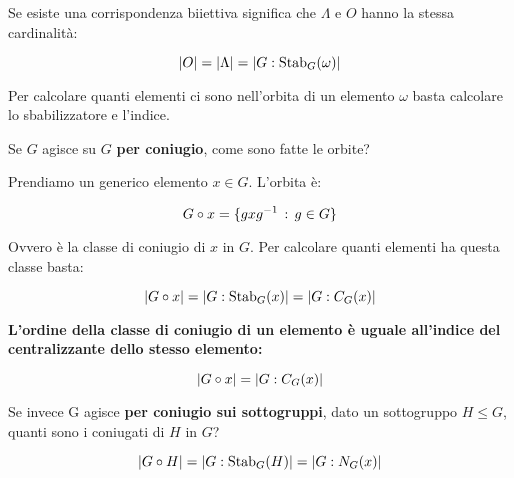 Se esiste una corrispondenza biiettiva significa che $\Lambda$ e $O$ hanno la stessa cardinalità:

\begin{equation}
	\label{eq:ordine_orbita} \lvert O \rvert = \lvert \Lambda \rvert = \lvert G:\operatorname{Stab}_G(\omega) \rvert
\end{equation}

Per calcolare quanti elementi ci sono nell'orbita di un elemento $\omega$ basta calcolare lo sbabilizzatore e l'indice.

Se $G$ agisce su $G$ \textbf{per coniugio}, come sono fatte le orbite?

Prendiamo un generico elemento $x \in G$. L'orbita è:

\begin{equation}
	G \circ x = \{gxg^{-1} \,:\, g \in G\}
\end{equation}

Ovvero è la classe di coniugio di $x$ in $G$. Per calcolare quanti elementi ha questa classe basta:

\begin{equation}
	\lvert G \circ x \rvert = \lvert G:\operatorname{Stab}_G(x) \rvert = \lvert G:C_G(x) \rvert
\end{equation}

\textbf{L'ordine della classe di coniugio di un elemento è uguale all'indice del centralizzante dello stesso elemento:}

\begin{equation}
	\label{eq:ordine_classe_coniugio}
	\lvert G \circ x \rvert = \lvert G:C_G(x) \rvert
\end{equation}

Se invece G agisce \textbf{per coniugio sui sottogruppi}, dato un sottogruppo $H \le G$, quanti sono i coniugati di $H$ in $G$?

\begin{equation}
	\lvert G \circ H \rvert = \lvert G:\operatorname{Stab}_G(H) \rvert = \lvert G:N_G(x) \rvert
\end{equation}

